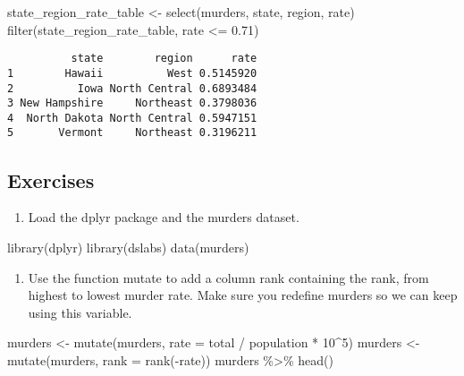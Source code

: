 \documentclass[
  letterpaper,
  DIV=11,
  numbers=noendperiod]{scrreprt}
\newenvironment{Shaded}{\begin{snugshade}}{\end{snugshade}}
\newcommand{\AttributeTok}[1]{\textcolor[rgb]{0.40,0.45,0.13}{#1}}
\newcommand{\DecValTok}[1]{\textcolor[rgb]{0.68,0.00,0.00}{#1}}
\newcommand{\FloatTok}[1]{\textcolor[rgb]{0.68,0.00,0.00}{#1}}
\newcommand{\FunctionTok}[1]{\textcolor[rgb]{0.28,0.35,0.67}{#1}}
\newcommand{\NormalTok}[1]{\textcolor[rgb]{0.00,0.23,0.31}{#1}}
\newcommand{\OtherTok}[1]{\textcolor[rgb]{0.00,0.23,0.31}{#1}}
\newcommand{\SpecialCharTok}[1]{\textcolor[rgb]{0.37,0.37,0.37}{#1}}
\providecommand{\tightlist}{%
  \setlength{\itemsep}{0pt}\setlength{\parskip}{0pt}}
\begin{document}
\begin{Shaded}
\begin{Highlighting}[]
\NormalTok{state\_region\_rate\_table }\OtherTok{\textless{}{-}} \FunctionTok{select}\NormalTok{(murders, state, region, rate)}
\FunctionTok{filter}\NormalTok{(state\_region\_rate\_table, rate }\SpecialCharTok{\textless{}=} \FloatTok{0.71}\NormalTok{)}
\end{Highlighting}
\end{Shaded}

\begin{verbatim}
          state        region      rate
1        Hawaii          West 0.5145920
2          Iowa North Central 0.6893484
3 New Hampshire     Northeast 0.3798036
4  North Dakota North Central 0.5947151
5       Vermont     Northeast 0.3196211
\end{verbatim}

\subsection{Exercises}\label{exercises}

\begin{enumerate}
\def\labelenumi{\arabic{enumi}.}
\tightlist
\item
  Load the dplyr package and the murders dataset.
\end{enumerate}

\begin{Shaded}
\begin{Highlighting}[]
\FunctionTok{library}\NormalTok{(dplyr)}
\FunctionTok{library}\NormalTok{(dslabs)}
\FunctionTok{data}\NormalTok{(murders)}
\end{Highlighting}
\end{Shaded}

\begin{enumerate}
\def\labelenumi{\arabic{enumi}.}
\setcounter{enumi}{1}
\tightlist
\item
  Use the function mutate to add a column rank containing the rank, from
  highest to lowest murder rate. Make sure you redefine murders so we
  can keep using this variable.
\end{enumerate}

\begin{Shaded}
\begin{Highlighting}[]
\NormalTok{murders }\OtherTok{\textless{}{-}} \FunctionTok{mutate}\NormalTok{(murders, }\AttributeTok{rate =}\NormalTok{ total }\SpecialCharTok{/}\NormalTok{ population }\SpecialCharTok{*} \DecValTok{10}\SpecialCharTok{\^{}}\DecValTok{5}\NormalTok{)}
\NormalTok{murders }\OtherTok{\textless{}{-}} \FunctionTok{mutate}\NormalTok{(murders, }\AttributeTok{rank =} \FunctionTok{rank}\NormalTok{(}\SpecialCharTok{{-}}\NormalTok{rate))}
\NormalTok{murders }\SpecialCharTok{\%\textgreater{}\%} \FunctionTok{head}\NormalTok{()}
\end{Highlighting}
\end{Shaded}
\end{document}
